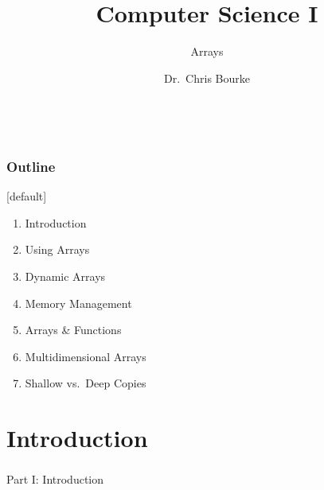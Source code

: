 \documentclass[]{beamer}
\title[~]{Computer Science I}
\subtitle{Arrays}
\author[~]{Dr.\ Chris Bourke\\ \email{cbourke@cse.unl.edu}} %
\date{~}
\begin{document}
\begin{frame}
  \titlepage
\end{frame}


\begin{frame}
  \frametitle{Outline}

[default]
\begin{enumerate}
  \item Introduction %
  \item Using Arrays %
  \item Dynamic Arrays %
  \item Memory Management
  \item Arrays \& Functions
  \item Multidimensional Arrays
  \item Shallow vs.\ Deep Copies %
\end{enumerate}

\end{frame}

\section{Introduction}

\begin{frame}
    \frametitle{}
    \framesubtitle{}
    
    \begin{center}
    {\Huge Part I: Introduction}\\
    {\Large ~}
    \end{center}

\end{frame}
\end{document}
